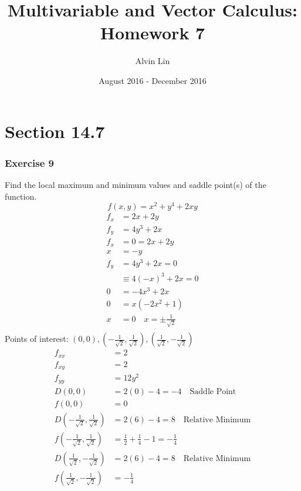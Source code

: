 \documentclass[letterpaper, 12pt]{math}
\title{Multivariable and Vector Calculus: Homework 7}
\author{Alvin Lin}
\date{August 2016 - December 2016}
\begin{document}
\maketitle

\section*{Section 14.7}

\subsubsection*{Exercise 9}
Find the local maximum and minimum values and saddle point(s) of the function.
\[ f(x,y) = x^2+y^4+2xy \]
\begin{align*}
  f_x &= 2x+2y \\
  f_y &= 4y^3+2x \\
  f_x &= 0 = 2x+2y \\
  x &= -y \\
  f_y &= 4y^3+2x = 0 \\
  &\equiv 4(-x)^3+2x = 0 \\
  0 &= -4x^3+2x \\
  0 &= x(-2x^2+1) \\
  x &= 0 \quad x = \pm\frac{1}{\sqrt{2}} \\
\end{align*}
Points of interest: \( (0,0), (-\frac{1}{\sqrt{2}},\frac{1}{\sqrt{2}}),
(\frac{1}{\sqrt{2}},-\frac{1}{\sqrt{2}}) \)
\begin{align*}
  f_{xx} &= 2 \\
  f_{xy} &= 2 \\
  f_{yy} &= 12y^2 \\
  D(0,0) &= 2(0)-4 = -4 \quad \text{Saddle Point}\\
  f(0,0) &= 0 \\
  D(-\frac{1}{\sqrt{2}},\frac{1}{\sqrt{2}}) &= 2(6)-4 = 8
    \quad \text{Relative Minimum}\\
  f(-\frac{1}{\sqrt{2}},\frac{1}{\sqrt{2}}) &= \frac{1}{2}+\frac{1}{4}-1 =
    -\frac{1}{4} \\
  D(\frac{1}{\sqrt{2}},-\frac{1}{\sqrt{2}}) &= 2(6)-4 = 8
    \quad \text{Relative Minimum} \\
  f(\frac{1}{\sqrt{2}},-\frac{1}{\sqrt{2}}) &= -\frac{1}{4}
\end{align*}
\end{document}
